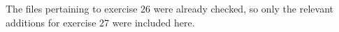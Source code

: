 The files pertaining to exercise 26 were already checked, so only the relevant additions for exercise 27 were included here.
